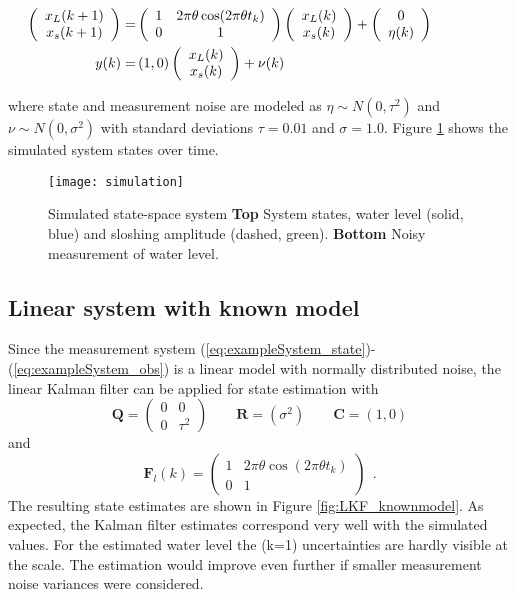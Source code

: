 \documentclass[10pt]{article}
\begin{document}
\begin{spacing}{1}
\begin{align}
\hspace{-10ex}	\left( \begin{array}{c}
x_L(k+1) \\ x_s(k+1)
\end{array}\right)
 =& 
\left(\begin{array}{cc}
1 & 2\pi\theta \cos(2\pi\theta t_k) \\ 0 & 1
\end{array}\right)
\left( \begin{array}{c}
x_L(k) \\ x_s(k)
\end{array}\right)
+
\left( \begin{array}{c}
0 \\ \eta(k)
\end{array}\right) \label{eq:exampleSystem_state}  \\
\hspace{-10ex}y(k) =& \left( 1, 0 \right) \left( \begin{array}{c}
x_L(k) \\ x_s(k)
\end{array}\right)
+ \nu(k) \label{eq:exampleSystem_obs}
\end{align}

where state and measurement noise are modeled as $\eta\sim N(0,\tau^2)$ and $\nu \sim N(0,\sigma^2)$ with standard deviations $\tau = 0.01$ and $\sigma = 1.0$. Figure \ref{fig:simulated} shows the simulated system states over time. 

\begin{figure}[h!]
	\centering 
	\texttt{[image: simulation]}
	\caption{Simulated state-space system \textbf{Top} System states, water level (solid, blue) and sloshing amplitude (dashed, green). \textbf{Bottom} Noisy measurement of water level.}
\label{fig:simulated}
\end{figure}

\subsection{Linear system with known model}

Since the measurement system (\ref{eq:exampleSystem_state})-(\ref{eq:exampleSystem_obs}) is a linear model with normally distributed noise, the linear Kalman filter can be applied for state estimation with
\[ \bm{Q} = \left(\begin{array}{cc}
0 & 0 \\ 0 & \tau^2
\end{array}\right) \qquad \bm{R} = \left( \sigma^2 \right) \qquad \bm{C}=(1,0) \]
and
\[ 
\bm{F}_l(k) = \left(\begin{array}{cc}
1 & 2\pi\theta \cos(2\pi\theta t_k) \\ 0 & 1
\end{array}\right) ~~.
\]
The resulting state estimates are shown in Figure \ref{fig:LKF_knownmodel}. As expected, the Kalman filter estimates correspond very well with the simulated values. For the estimated water level the (k=1) uncertainties are hardly visible at the scale. The estimation would improve even further if smaller measurement noise variances were considered.


\end{spacing}
\end{document}

